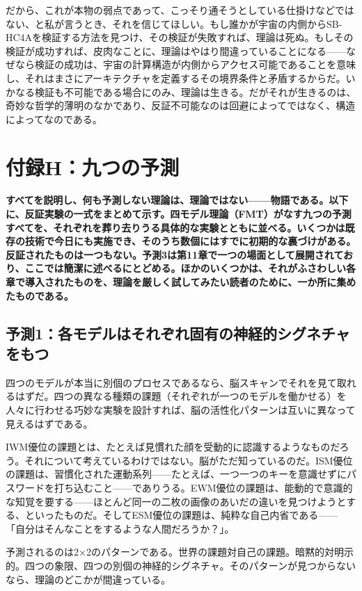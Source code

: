 \documentclass[11pt, twoside, openright]{book}
\begin{document}
だから、これが本物の弱点であって、こっそり通そうとしている仕掛けなどではない、と私が言うとき、それを信じてほしい。もし誰かが宇宙の内側からSB-HC4Aを検証する方法を見つけ、その検証が失敗すれば、理論は死ぬ。もしその検証が成功すれば、皮肉なことに、理論はやはり間違っていることになる------なぜなら検証の成功は、宇宙の計算構造が内側からアクセス可能であることを意味し、それはまさにアーキテクチャを定義するその境界条件と矛盾するからだ。いかなる検証も不可能である場合にのみ、理論は生きる。だがそれが生きるのは、奇妙な哲学的薄明のなかであり、反証不可能なのは回避によってではなく、構造によってなのである。


\chapter*{付録H：九つの予測}

\textbf{すべてを説明し、何も予測しない理論は、理論ではない------物語である。以下に、反証実験の一式をまとめて示す。四モデル理論（FMT）がなす九つの予測すべてを、それぞれを葬り去りうる具体的な実験とともに並べる。いくつかは既存の技術で今日にも実施でき、そのうち数個にはすでに初期的な裏づけがある。反証されたものは一つもない。予測3は第11章で一つの場面として展開されており、ここでは簡潔に述べるにとどめる。ほかのいくつかは、それがふさわしい各章で導入されたものを、理論を厳しく試してみたい読者のために、一か所に集めたものである。}

\section*{予測1：各モデルはそれぞれ固有の神経的シグネチャをもつ}

四つのモデルが本当に別個のプロセスであるなら、脳スキャンでそれを見て取れるはずだ。四つの異なる種類の課題（それぞれが一つのモデルを働かせる）を人々に行わせる巧妙な実験を設計すれば、脳の活性化パターンは互いに異なって見えるはずである。

IWM優位の課題とは、たとえば見慣れた顔を受動的に認識するようなものだろう。それについて考えているわけではない。脳がただ知っているのだ。ISM優位の課題は、習慣化された運動系列------たとえば、一つ一つのキーを意識せずにパスワードを打ち込むこと------でありうる。EWM優位の課題は、能動的で意識的な知覚を要する------ほとんど同一の二枚の画像のあいだの違いを見つけようとする、といったものだ。そしてESM優位の課題は、純粋な自己内省である------「自分はそんなことをするような人間だろうか？」。

予測されるのは2×2のパターンである。世界の課題対自己の課題。暗黙的対明示的。四つの象限、四つの別個の神経的シグネチャ。そのパターンが見つからないなら、理論のどこかが間違っている。
\end{document}

